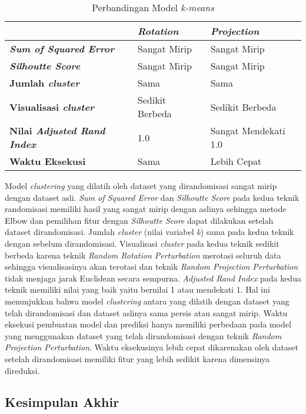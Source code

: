 \begin{table}
	\centering
	\caption{Perbandingan Model \textit{k-means}}
	\begin{tabular}{|l|l|l|}
		\hline
		& \textbf{\textit{Rotation}} & \textbf{\textit{Projection}} \\ \hline
		\textbf{\textit{Sum of Squared Error}} & Sangat Mirip & Sangat Mirip \\
		\textbf{\textit{Silhoutte Score}} & Sangat Mirip & Sangat Mirip \\
		\textbf{Jumlah \textit{cluster}} & Sama & Sama \\
		\textbf{Visualisasi \textit{cluster}} & Sedikit Berbeda & Sedikit Berbeda \\
		\textbf{Nilai \textit{Adjusted Rand Index}} & 1.0 & Sangat Mendekati 1.0 \\
		\textbf{Waktu Eksekusi} & Sama & Lebih Cepat \\
		\hline
	\end{tabular}
	\label{table:perbandingan-clustering}
\end{table}

Model \textit{clustering} yang dilatih oleh dataset yang dirandomisasi sangat mirip dengan dataset asli. \textit{Sum of Squared Error} dan \textit{Silhoutte Score} pada kedua teknik randomisasi memiliki hasil yang sangat mirip dengan aslinya sehingga metode Elbow dan pemilihan fitur dengan \textit{Silhoutte Score} dapat dilakukan setelah dataset dirandomisasi. Jumlah \textit{cluster} (nilai variabel \textit{k}) sama pada kedua teknik dengan sebelum dirandomisasi. Visualisasi \textit{cluster} pada kedua teknik sedikit berbeda karena teknik \textit{Random Rotation Perturbation} merotasi seluruh data sehingga visualisasinya akan terotasi dan teknik \textit{Random Projection Perturbation} tidak menjaga jarak Euclidean secara sempurna. \textit{Adjusted Rand Index} pada kedua teknik memiliki nilai yang baik yaitu bernilai 1 atau mendekati 1. Hal ini menunjukkan bahwa model \textit{clustering} antara yang dilatih dengan dataset yang telah dirandomisasi dan dataset aslinya sama persis atau sangat mirip. Waktu eksekusi pembuatan model dan prediksi hanya memiliki perbedaan pada model yang menggunakan dataset yang telah dirandomisasi dengan teknik \textit{Random Projection Perturbation}. Waktu eksekusinya lebih cepat dikarenakan oleh dataset setelah dirandomisasi memiliki fitur yang lebih sedikit karena dimensinya direduksi.

\subsection{Kesimpulan Akhir}
\label{subsec:kesimpulan-eksperimental}

